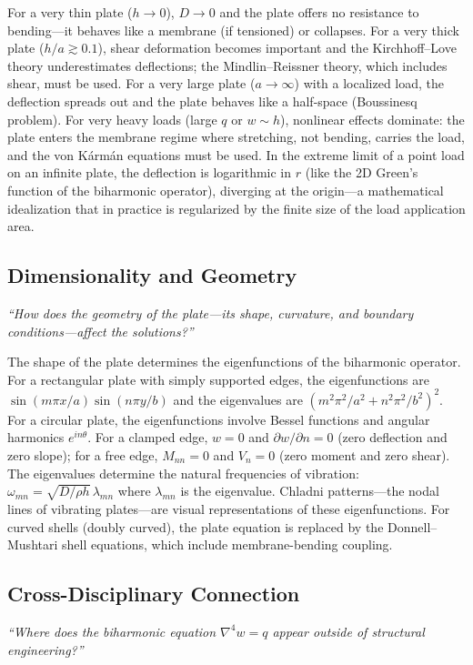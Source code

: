 \documentclass[11pt,openright]{book}
\begin{document}
For a very thin plate ($h \to 0$), $D \to 0$ and the plate offers no resistance to bending---it behaves like a membrane (if tensioned) or collapses. For a very thick plate ($h/a \gtrsim 0.1$), shear deformation becomes important and the Kirchhoff--Love theory underestimates deflections; the Mindlin--Reissner theory, which includes shear, must be used. For a very large plate ($a \to \infty$) with a localized load, the deflection spreads out and the plate behaves like a half-space (Boussinesq problem). For very heavy loads (large $q$ or $w \sim h$), nonlinear effects dominate: the plate enters the membrane regime where stretching, not bending, carries the load, and the von Kármán equations must be used. In the extreme limit of a point load on an infinite plate, the deflection is logarithmic in $r$ (like the 2D Green's function of the biharmonic operator), diverging at the origin---a mathematical idealization that in practice is regularized by the finite size of the load application area.

\subsection*{Dimensionality and Geometry}
\textit{``How does the geometry of the plate---its shape, curvature, and boundary conditions---affect the solutions?''}

The shape of the plate determines the eigenfunctions of the biharmonic operator. For a rectangular plate with simply supported edges, the eigenfunctions are $\sin(m\pi x/a)\sin(n\pi y/b)$ and the eigenvalues are $(m^{2}\pi^{2}/a^{2} + n^{2}\pi^{2}/b^{2})^{2}$. For a circular plate, the eigenfunctions involve Bessel functions and angular harmonics $e^{in\theta}$. For a clamped edge, $w = 0$ and $\partial w/\partial n = 0$ (zero deflection and zero slope); for a free edge, $M_{nn} = 0$ and $V_{n} = 0$ (zero moment and zero shear). The eigenvalues determine the natural frequencies of vibration: $\omega_{mn} = \sqrt{D/\rho h}\,\lambda_{mn}$ where $\lambda_{mn}$ is the eigenvalue. Chladni patterns---the nodal lines of vibrating plates---are visual representations of these eigenfunctions. For curved shells (doubly curved), the plate equation is replaced by the Donnell--Mushtari shell equations, which include membrane-bending coupling.

\subsection*{Cross-Disciplinary Connection}
\textit{``Where does the biharmonic equation $\nabla^{4}w = q$ appear outside of structural engineering?''}
\end{document}
